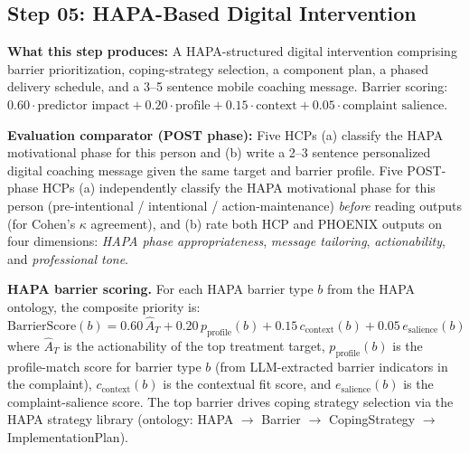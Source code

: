 \documentclass[11pt,a4paper]{article}
\begin{document}
\subsection{Step 05: HAPA-Based Digital Intervention}
\label{sec:step05}

\begin{tcolorbox}[
  colback=StepFiveBG,colframe=PhoenixTeal,
  boxrule=0.6pt,arc=1.5mm,left=8pt,right=8pt
]
\small\textbf{What this step produces:} A HAPA-structured digital intervention comprising barrier prioritization, coping-strategy selection, a component plan, a phased delivery schedule, and a 3--5 sentence mobile coaching message. Barrier scoring: $0.60 \cdot \text{predictor impact} + 0.20 \cdot \text{profile} + 0.15 \cdot \text{context} + 0.05 \cdot \text{complaint salience}$.

\textbf{Evaluation comparator (POST phase):} Five HCPs (a) classify the HAPA motivational phase for this person and (b) write a 2--3 sentence personalized digital coaching message given the same target and barrier profile. Five POST-phase HCPs (a) independently classify the HAPA motivational phase for this person (pre-intentional / intentional / action-maintenance) \emph{before} reading outputs (for Cohen's $\kappa$ agreement), and (b) rate both HCP and PHOENIX outputs on four dimensions: \emph{HAPA phase appropriateness}, \emph{message tailoring}, \emph{actionability}, and \emph{professional tone}.
\end{tcolorbox}

\begin{tcolorbox}[colback=PhoenixSoft,colframe=PhoenixTeal!40,boxrule=0.5pt,arc=1.5mm,left=7pt,right=7pt,top=6pt,bottom=6pt]
\small\textbf{HAPA barrier scoring.} For each HAPA barrier type $b$ from the HAPA ontology, the composite priority is:
\[
  \text{BarrierScore}(b) = 0.60\,\hat{A}_{T} + 0.20\,p_{\text{profile}}(b) + 0.15\,c_{\text{context}}(b) + 0.05\,e_{\text{salience}}(b)
\]
where $\hat{A}_{T}$ is the actionability of the top treatment target, $p_{\text{profile}}(b)$ is the profile-match score for barrier type $b$ (from LLM-extracted barrier indicators in the complaint), $c_{\text{context}}(b)$ is the contextual fit score, and $e_{\text{salience}}(b)$ is the complaint-salience score. The top barrier drives coping strategy selection via the HAPA strategy library (ontology: HAPA $\to$ Barrier $\to$ CopingStrategy $\to$ ImplementationPlan).
\end{tcolorbox}
\end{document}

